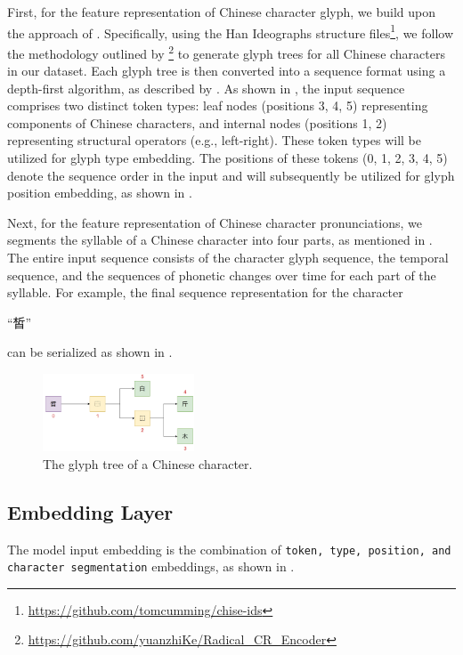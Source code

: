 First, for the feature representation of Chinese character glyph, we build upon the approach of \citet{lyu2021glyph}. Specifically, using the Han Ideographs structure files\footnote{\url{https://github.com/tomcumming/chise-ids}}, we follow the methodology outlined by \citet{ke2017radical}\footnote{\url{https://github.com/yuanzhiKe/Radical\_CR\_Encoder}} to generate glyph trees for all Chinese characters in our dataset. Each glyph tree is then converted into a sequence format using a depth-first algorithm, as described by \citet{nguyen2019hierarchical}. As shown in , the input sequence comprises two distinct token types: leaf nodes (positions 3, 4, 5) representing components of Chinese characters, and internal nodes (positions 1, 2) representing structural operators (e.g., left-right). These token types will be utilized for glyph type embedding. The positions of these tokens (0, 1, 2, 3, 4, 5) denote the sequence order in the input and will subsequently be utilized for glyph position embedding, as shown in .

Next, for the feature representation of Chinese character pronunciations, we segments the syllable of a Chinese character into four parts, as mentioned in . The entire input sequence consists of the character glyph sequence, the temporal sequence, and the sequences of phonetic changes over time for each part of the syllable. For example, the final sequence representation for the character \begin{CJK*}{UTF8}{gbsn}
“皙”
\end{CJK*} can be serialized as shown in .

\begin{figure}[ht]
    \centering
    \includegraphics[width=0.4\textwidth]{images/character_tree.png}
    \caption{The glyph tree of a Chinese character. }
    \label{fig:glyph_embedding}
\end{figure}

\subsection{Embedding Layer}
The model input embedding is the combination of \texttt{token, type, position, and character segmentation} embeddings, as shown in .

